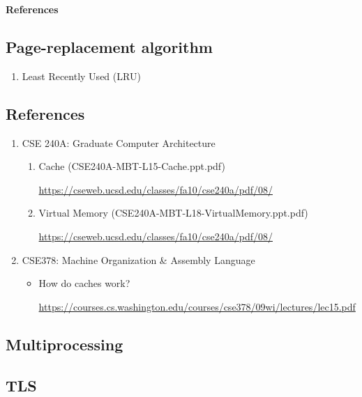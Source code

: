 \documentclass[12pt,a4paper]{article}
\begin{document}
\textbf{References}

\subsection{Page-replacement algorithm}

\begin{enumerate}
\item Least Recently Used (LRU)
\end{enumerate}

\subsection{References}

\begin{enumerate}
\item CSE 240A: Graduate Computer Architecture

	\begin{enumerate}
    \item Cache (CSE240A-MBT-L15-Cache.ppt.pdf)

        \url{https://cseweb.ucsd.edu/classes/fa10/cse240a/pdf/08/}

    \item Virtual Memory (CSE240A-MBT-L18-VirtualMemory.ppt.pdf)

        \url{https://cseweb.ucsd.edu/classes/fa10/cse240a/pdf/08/}

    \end{enumerate}

\item CSE378: Machine Organization \& Assembly Language

    \begin{itemize}
    \item How do caches work?

        \url{https://courses.cs.washington.edu/courses/cse378/09wi/lectures/lec15.pdf}

    \end{itemize}

\end{enumerate}

\subsection{Multiprocessing}

\subsection{TLS}
\end{document}
